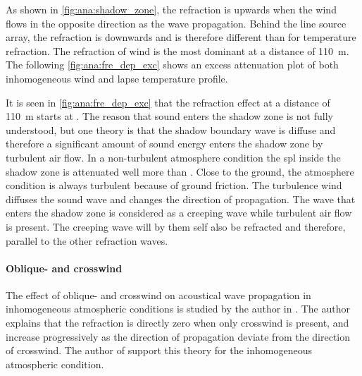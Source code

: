 
As shown in \autoref{fig:ana:shadow_zone}, the refraction is upwards when the wind flows in the opposite direction as the wave propagation. Behind the line source array, the refraction is downwards and is therefore different than for temperature refraction. The refraction of wind is the most dominant at a distance of \SI{110}{\meter}. The following \autoref{fig:ana:fre_dep_exc} shows an excess attenuation plot of both inhomogeneous wind and lapse temperature profile. 


It is seen in \autoref{fig:ana:fre_dep_exc} that the refraction effect at a distance of \SI{110}{\meter} starts at . The reason that sound enters the shadow zone is not fully understood, but one theory is that the shadow boundary wave is diffuse and therefore a significant amount of sound energy enters the shadow zone by turbulent air flow. In a non-turbulent atmosphere condition the \gls{spl} inside the shadow zone is attenuated well more than . Close to the ground, the atmosphere condition is always turbulent because of ground friction. The turbulence wind diffuses the sound wave and changes the direction of propagation. The wave that enters the shadow zone is considered as a creeping wave while turbulent air flow is present. The creeping wave will by them self also be refracted and therefore, parallel to the other refraction waves. \citep{tur_on_sound}




\paragraph{Oblique- and crosswind} The effect of oblique- and crosswind on acoustical wave propagation in inhomogeneous atmospheric conditions is studied by the author in \citep{review_of_sound}. The author explains that the refraction is directly zero when only crosswind is present, and increase progressively as the direction of propagation deviate from the direction of crosswind. The author of \citep{no_refraction_1998} support this theory for the inhomogeneous atmospheric condition.

